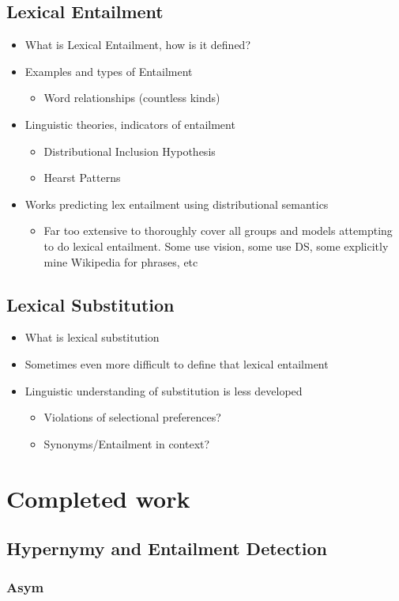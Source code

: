 \documentclass[letterpaper]{article}
\begin{document}
\subsection{Lexical Entailment}
\begin{itemize}
  \item What is Lexical Entailment, how is it defined?
  \item Examples and types of Entailment
    \begin{itemize}
      \item Word relationships (countless kinds)
    \end{itemize}
  \item Linguistic theories, indicators of entailment
  \begin{itemize}
    \item Distributional Inclusion Hypothesis
    \item Hearst Patterns
  \end{itemize}
  \item Works predicting lex entailment using distributional semantics
    \begin{itemize}
      \item Far too extensive to thoroughly cover all groups and models attempting
      to do lexical entailment. Some use vision, some use DS, some explicitly mine
      Wikipedia for phrases, etc
    \end{itemize}
\end{itemize}

\subsection{Lexical Substitution}
\begin{itemize}
  \item What is lexical substitution
  \item Sometimes even more difficult to define that lexical entailment
  \item Linguistic understanding of substitution is less developed
    \begin{itemize}
      \item Violations of selectional preferences?
      \item Synonyms/Entailment in context?
    \end{itemize}
\end{itemize}

\section{Completed work}

\subsection{Hypernymy and Entailment Detection}

\subsubsection{Asym}

\subsubsection{}


\pagebreak


\end{document}
